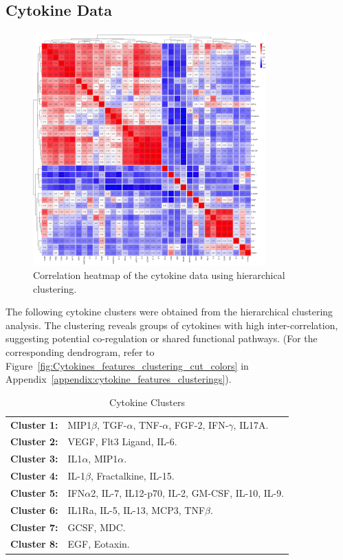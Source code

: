 \documentclass[12pt,a4paper]{report}
\begin{document}
\subsection{Cytokine Data}
\begin{figure}[h!]
  \centering
  \includegraphics[width=0.8\textwidth]{images/Cytokine_euclidean_distance.png}
  \caption[cytokines data correlations]{Correlation heatmap of the cytokine data using hierarchical clustering.}
  \label{fig:cytokine_heatmap}
\end{figure}
\noindent
The following cytokine clusters were obtained from the hierarchical clustering analysis. The clustering reveals groups of cytokines with high inter-correlation, suggesting potential co-regulation or shared functional pathways. (For the corresponding dendrogram, refer to Figure~\ref{fig:Cytokines_features_clustering_cut_colors} in Appendix~\ref{appendix:cytokine_features_clusterings}).

\begin{table}[h!]
    \centering
    \begin{tabular}{ll}
        \textbf{Cluster 1:} & MIP1$\beta$, TGF-$\alpha$, TNF-$\alpha$, FGF-2, IFN-$\gamma$, IL17A. \\
        \textbf{Cluster 2:} & VEGF, Flt3 Ligand, IL-6. \\
        \textbf{Cluster 3:} & IL1$\alpha$, MIP1$\alpha$. \\
        \textbf{Cluster 4:} & IL-1$\beta$, Fractalkine, IL-15. \\
        \textbf{Cluster 5:} & IFN$\alpha$2, IL-7, IL12-p70, IL-2, GM-CSF, IL-10, IL-9. \\
        \textbf{Cluster 6:} & IL1Ra, IL-5, IL-13, MCP3, TNF$\beta$. \\
        \textbf{Cluster 7:} & GCSF, MDC. \\
        \textbf{Cluster 8:} & EGF, Eotaxin.
    \end{tabular}
    \caption{Cytokine Clusters}
    \label{tab:cytokine_clusters}
\end{table}
\end{document}

